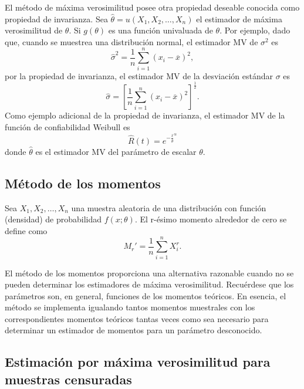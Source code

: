 El método de máxima verosimilitud posee otra propiedad deseable conocida como propiedad de invarianza. Sea $\hat{\theta}=u(X_1,X_2,\ldots,X_n)$ el estimador de máxima verosimilitud de $\theta$. Si $g(\theta)$ es una función univaluada de $\theta$. Por ejemplo, dado que, cuando se muestrea una distribución normal, el estimador MV de $\sigma^2$ es
$$\hat{\sigma}^2 = \dfrac{1}{n}\sum_{i=1}^n \left(x_i-\overline{x}\right)^2,$$
por la propiedad de invarianza, el estimador MV de la desviación estándar $\sigma$ es
$$\hat{\sigma}=\left[\dfrac{1}{n}\sum_{i=1}^n (x_i-\overline{x})^2\right]^{\frac{1}{2}}.$$
Como ejemplo adicional de la propiedad de invarianza, el estimador MV de la función de confiabilidad Weibull es
$$\hat{R}(t)=e^{-\frac{t}{\hat{\theta}}^\alpha}$$
donde $\hat{\theta}$ es el estimador MV del parámetro de escalar $\theta$.


\subsection{Método de los momentos}

\begin{def.}
    Sea $X_1,X_2,\ldots,X_n$ una muestra aleatoria de una distribución con función (densidad) de probabilidad $f(x;\theta)$. El r-ésimo momento alrededor de cero se define como
    $$M_r'=\dfrac{1}{n}\sum_{i=1}^n X_i^r.$$
\end{def.}

El método de los momentos proporciona una alternativa razonable cuando no se pueden determinar los estimadores de máxima verosimilitud. Recuérdese que los parámetros son, en general, funciones de los momentos teóricos. En esencia, el método se implementa igualando tantos momentos muestrales con los correspondientes momentos teóricos tantas veces como sea necesario para determinar un estimador de momentos para un parámetro desconocido.

\subsection{Estimación por máxima verosimilitud para muestras censuradas}
